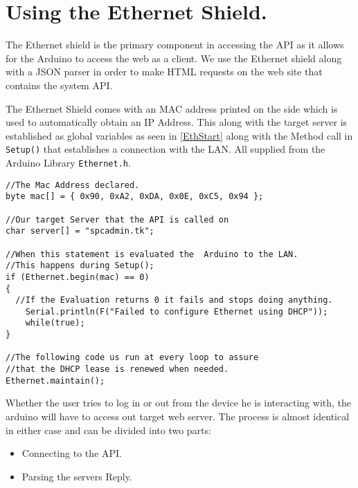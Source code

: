 \documentclass{report}
\begin{document}
\section{Using the Ethernet Shield.}
The Ethernet shield is the primary component in accessing the API as it allows for the Arduino to access the web as a client.
We use the Ethernet shield along with a JSON parser in order to make HTML requests on the web site that contains the system API.

The Ethernet Shield comes with an MAC address printed on the side which is used to automatically obtain an IP Address.
This along with the target server is established as global variables as seen in \autoref{EthStart} along with the Method call in \verb|Setup()| that establishes a connection with the LAN. All supplied from the Arduino Library \verb|Ethernet.h|.
\begin{lstlisting}[label=EthStart, caption=The Method Calls used to establish and maintain a connection.]
//The Mac Address declared.
byte mac[] = { 0x90, 0xA2, 0xDA, 0x0E, 0xC5, 0x94 };

//Our target Server that the API is called on
char server[] = "spcadmin.tk";

//When this statement is evaluated the  Arduino to the LAN.
//This happens during Setup();
if (Ethernet.begin(mac) == 0) 
{
  //If the Evaluation returns 0 it fails and stops doing anything.
	Serial.println(F("Failed to configure Ethernet using DHCP"));
	while(true); 
}

//The following code us run at every loop to assure
//that the DHCP lease is renewed when needed.
Ethernet.maintain();
\end{lstlisting}

Whether the user tries to log in or out from the device he is interacting with, the arduino will have to access out target web server.
The process is almost identical in either case and can be divided into two parts:
\begin{itemize}
	\item Connecting to the API.
	\item Parsing the servers Reply.
\end{itemize}
\end{document}

